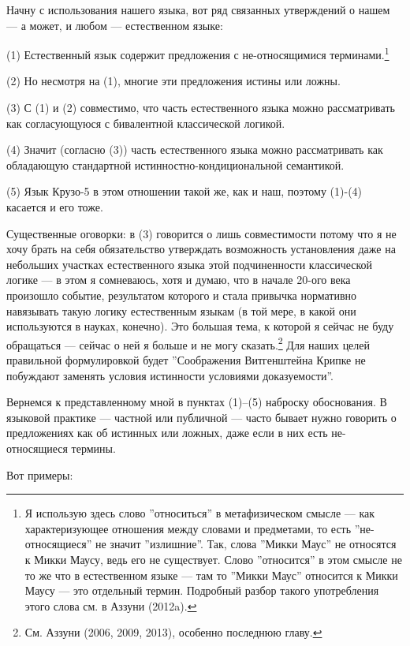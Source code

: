 \documentclass[11pt]{book}
\begin{document}
Начну с использования нашего языка, вот ряд связанных утверждений о нашем --- а может, и любом --- естественном языке:

\smallskip

(1) Естественный язык содержит предложения с не-относящимися терминами.\footnote{Я использую здесь слово ''относиться'' в метафизическом смысле --- как характеризующее отношения между словами и предметами, то есть ''не-относящиеся'' не значит ''излишние''. Так, слова ''Микки Маус'' не относятся к Микки Маусу, ведь его не существует. Слово ''относится'' в этом смысле не то же что в естественном языке --- там то ''Микки Маус'' относится к Микки Маусу --- это отдельный термин. Подробный разбор такого употребления этого слова см. в Аззуни (2012a).}

(2) Но несмотря на (1), многие эти предложения истины или ложны.

(3) С (1) и (2) совместимо, что часть естественного языка можно рассматривать как согласующуюся с бивалентной классической логикой.

(4) Значит (согласно (3)) часть естественного языка можно рассматривать как обладающую стандартной истинностно-кондициональной семантикой.

(5) Язык Крузо-5 в этом отношении такой же, как и наш, поэтому (1)-(4) касается и его тоже.

\smallskip

Существенные оговорки: в (3) говорится о лишь совместимости потому что я не хочу брать на себя обязательство утверждать возможность установления даже на небольших участках естественного языка этой подчиненности классической логике --- в этом я сомневаюсь, хотя и думаю, что в начале 20-ого века произошло событие, результатом которого и стала привычка нормативно навязывать такую логику естественным языкам (в той мере, в какой они используются в науках, конечно). Это большая тема, к которой я сейчас не буду обращаться --- сейчас о ней я больше и не могу сказать.\footnote{См. Аззуни (2006, 2009, 2013), особенно последнюю главу.} Для наших целей правильной формулировкой будет ''Соображения Витгенштейна Крипке не побуждают заменять условия истинности условиями доказуемости''.

Вернемся к представленному мной в пунктах (1)--(5) наброску обоснования. В языковой практике --- частной или публичной --- часто бывает нужно говорить о предложениях как об истинных или ложных, даже если в них есть не-относящиеся термины.

Вот примеры:
\end{document}
